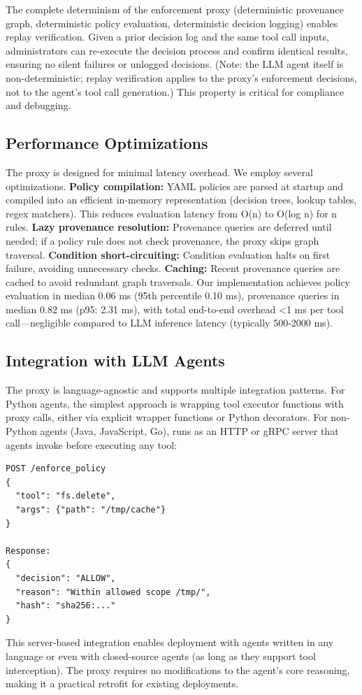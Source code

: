 The complete determinism of the enforcement proxy (deterministic provenance graph, deterministic policy evaluation, deterministic decision logging) enables replay verification. Given a prior decision log and the same tool call inputs, administrators can re-execute the decision process and confirm identical results, ensuring no silent failures or unlogged decisions. (Note: the LLM agent itself is non-deterministic; replay verification applies to the proxy's enforcement decisions, not to the agent's tool call generation.) This property is critical for compliance and debugging.

\subsection{Performance Optimizations}

The proxy is designed for minimal latency overhead. We employ several optimizations. \textbf{Policy compilation:} YAML policies are parsed at startup and compiled into an efficient in-memory representation (decision trees, lookup tables, regex matchers). This reduces evaluation latency from O(n) to O(log n) for n rules. \textbf{Lazy provenance resolution:} Provenance queries are deferred until needed; if a policy rule does not check provenance, the proxy skips graph traversal. \textbf{Condition short-circuiting:} Condition evaluation halts on first failure, avoiding unnecessary checks. \textbf{Caching:} Recent provenance queries are cached to avoid redundant graph traversals. Our implementation achieves policy evaluation in median 0.06 ms (95th percentile 0.10 ms), provenance queries in median 0.82 ms (p95: 2.31 ms), with total end-to-end overhead <1 ms per tool call—negligible compared to LLM inference latency (typically 500-2000 ms).

\subsection{Integration with LLM Agents}

The proxy is language-agnostic and supports multiple integration patterns. For Python agents, the simplest approach is wrapping tool executor functions with proxy calls, either via explicit wrapper functions or Python decorators. For non-Python agents (Java, JavaScript, Go), \sys{} runs as an HTTP or gRPC server that agents invoke before executing any tool:

\begin{verbatim}
POST /enforce_policy
{
  "tool": "fs.delete",
  "args": {"path": "/tmp/cache"}
}

Response:
{
  "decision": "ALLOW",
  "reason": "Within allowed scope /tmp/",
  "hash": "sha256:..."
}
\end{verbatim}

This server-based integration enables deployment with agents written in any language or even with closed-source agents (as long as they support tool interception). The proxy requires no modifications to the agent's core reasoning, making it a practical retrofit for existing deployments.
